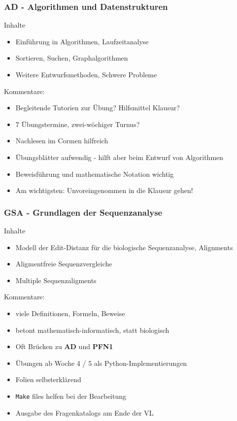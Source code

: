 \begin{frame}
     \frametitle{AD - Algorithmen und Datenstrukturen}
  \logos 

\begin{alertblock}{Inhalte}
    \begin{itemize}
        \item Einführung in Algorithmen, Laufzeitanalyse
        \item Sortieren, Suchen, Graphalgorithmen
        \item Weitere Entwurfsmethoden, Schwere Probleme
    \end{itemize}
\end{alertblock}
\pause
Kommentare:
\begin{itemize}
    \item Begleitende Tutorien zur Übung? Hilfsmittel Klausur?
    \item 7 Übungstermine, zwei-wöchiger Turnus?
    \item Nachlesen im Cormen hilfreich
    \item Übungsblätter aufwendig - hilft aber beim Entwurf von Algorithmen
    \item Beweisführung und mathematische Notation wichtig
    \item Am wichtigsten: Unvoreingenommen in die Klausur gehen!
\end{itemize}

\end{frame}


\begin{frame}
     \frametitle{GSA - Grundlagen der Sequenzanalyse}
  \logos 
    \begin{alertblock}{Inhalte}
  \small
      \begin{itemize}
          \item Modell der Edit-Distanz für die biologische Sequenzanalyse, Alignments
          \item Aligmentfreie Sequenzvergleiche
          \item Multiple Sequenzaligments
      \end{itemize}
 
  \end{alertblock}

\pause
Kommentare:
\begin{itemize}
    \item viele Definitionen, Formeln, Beweise
    \item betont mathematisch-informatisch, statt biologisch
    \item Oft Brücken zu \textbf{AD} und \textbf{PFN1}
    \item Übungen ab Woche 4 / 5 als Python-Implementierungen
    \item Folien selbsterklärend
    \item \texttt{Make} files helfen bei der Bearbeitung
    \item Ausgabe des Fragenkatalogs am Ende der VL
\end{itemize}


  
\end{frame}


